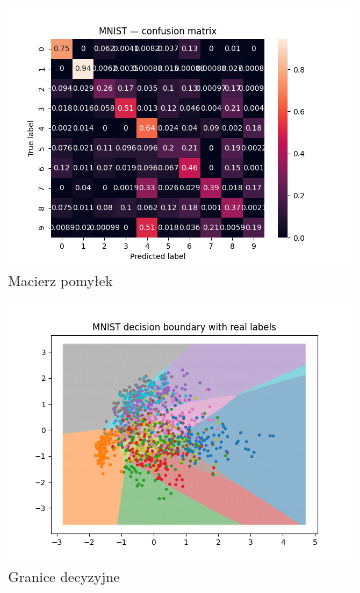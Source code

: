 \documentclass[10pt]{article}
\begin{document}
\begin{figure}[H]
    \centering
    \begin{subfigure}[t]{.32\textwidth}\centering
        \includegraphics[width=\linewidth]{img/PCA/PCA_after}
        \caption{Macierz pomyłek}\label{fig:pca-cm-yo}
    \end{subfigure}
    \hspace{-3em}
    \begin{subfigure}[t]{.32\textwidth}\centering
        \includegraphics[width=\linewidth]{img/PCA/PCA_after_decision}
        \caption{Granice decyzyjne}\label{fig:pca-db-yo}
    \end{subfigure}
    \hspace{-3em}
    \begin{subfigure}[t]{.32\textwidth}\centering

\end{subfigure}
\end{figure}
\end{document}
